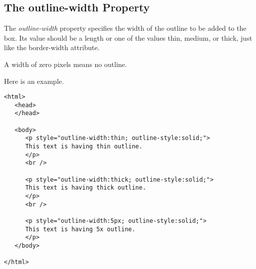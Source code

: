 \documentclass[a4paper,oneside]{book}
\numberwithin{equation}{chapter}
\begin{document}
\subsection{The outline-width Property}
The \textit{outline-width} property specifies the width of the outline to be added to the box. Its value should be a length or one of the values thin, medium, or thick, just like the border-width attribute.

A width of zero pixels means no outline.

Here is an example.
\begin{verbatim}
<html>
   <head>
   </head>
   
   <body>
      <p style="outline-width:thin; outline-style:solid;">
      This text is having thin outline.
      </p>
      <br />
      
      <p style="outline-width:thick; outline-style:solid;">
      This text is having thick outline.
      </p>
      <br />
      
      <p style="outline-width:5px; outline-style:solid;">
      This text is having 5x outline.
      </p>
   </body>
   
</html> 
\end{verbatim}
\end{document}

